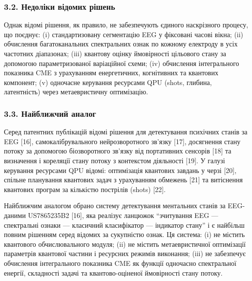 \documentclass[12pt,a4paper]{article}
\begin{document}
\subsubsection{3.2. Недоліки відомих рішень}\label{ux43dux435ux434ux43eux43bux456ux43aux438-ux432ux456ux434ux43eux43cux438ux445-ux440ux456ux448ux435ux43dux44c}



Однак відомі рішення, як правило, не забезпечують єдиного наскрізного процесу, що поєднує: (i) стандартизовану сегментацію EEG у фіксовані часові вікна; (ii) обчислення багатоканальних спектральних ознак по кожному електроду в усіх частотних діапазонах; (iii) квантову оцінку ймовірності цільового стану за допомогою параметризованої варіаційної схеми; (iv) обчислення інтегрального показника CME з урахуванням енергетичних, когнітивних та квантових компонент; (v) одночасне керування ресурсами QPU (shots, глибина, латентність) через метаевристичну оптимізацію.



\subsubsection{3.3. Найближчий аналог}\label{ux43dux430ux439ux431ux43bux438ux436ux447ux438ux439-ux430ux43dux430ux43bux43eux433}



Серед патентних публікацій відомі рішення для детектування психічних станів за EEG {[}16{]}, самокалібрувального нейрозворотного зв'язку {[}17{]}, досягнення стану потоку за допомогою біозворотного зв'язку від портативних сенсорів {[}18{]} та визначення і кореляції стану потоку з контекстом діяльності {[}19{]}. У галузі керування ресурсами QPU відомі: оптимізація квантових завдань у черзі {[}20{]}, спільне планування квантових задач з урахуванням обмежень {[}21{]} та витіснення квантових програм за кількістю пострілів (shots) {[}22{]}.



Найближчим аналогом обрано систему детектування ментальних станів за EEG-даними US7865235B2 {[}16{]}, яка реалізує ланцюжок ``зчитування EEG --- спектральні ознаки --- класичний класифікатор --- індикатор стану'' і є найбільш повним рішенням серед відомих за сукупністю ознак. Ця система: (i) не містить квантового обчислювального модуля; (ii) не містить метаевристичної оптимізації параметрів квантової частини і ресурсних режимів виконання; (iii) не забезпечує обчислення інтегрального показника CME як функції одночасно спектральної енергії, складності задачі та квантово-оціненої ймовірності стану потоку.
\end{document}

